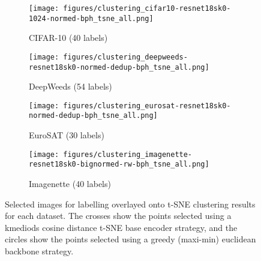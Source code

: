 \documentclass{article}
\begin{document}
\begin{figure}[!b]
     \begin{subfigure}[b]{0.5\textwidth}
         \centering
         \texttt{[image: figures/clustering\_cifar10-resnet18sk0-1024-normed-bph\_tsne\_all.png]}
         \caption{CIFAR-10 (40 labels)}
         \label{fig:tsne_clusters_cifar10}
     \end{subfigure}
     \hfill
     \begin{subfigure}[b]{0.5\textwidth}
         \centering
         \texttt{[image: figures/clustering\_deepweeds-resnet18sk0-normed-dedup-bph\_tsne\_all.png]}
         \caption{DeepWeeds (54 labels)}
         \label{fig:tsne_clusters_deepweeds}
     \end{subfigure}
     \begin{subfigure}[b]{0.5\textwidth}
         \centering
         \texttt{[image: figures/clustering\_eurosat-resnet18sk0-normed-dedup-bph\_tsne\_all.png]}
         \caption{EuroSAT (30 labels)}
         \label{fig:tsne_clusters_eurosat}
     \end{subfigure}
     \hfill
     \begin{subfigure}[b]{0.5\textwidth}
         \centering
         \texttt{[image: figures/clustering\_imagenette-resnet18sk0-bignormed-rw-bph\_tsne\_all.png]}
         \caption{Imagenette (40 labels)}
         \label{fig:tsne_clusters_imagenette}
     \end{subfigure}
\caption{Selected images for labelling overlayed onto t-SNE clustering results for each dataset. The crosses show the points selected using a kmediods cosine distance t-SNE base encoder strategy, and the circles show the points selected using a greedy (maxi-min) euclidean backbone strategy.}
\label{fig:tsne_clusters}
\end{figure}
\end{document}
